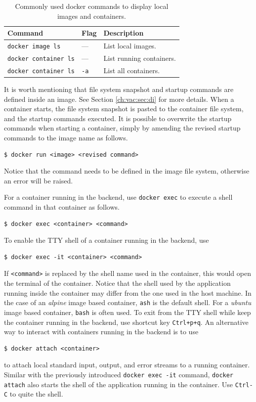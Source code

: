 \begin{table}
	\centering \caption{Commonly used docker commands to display local images and containers.}\label{ch:vac:tab:listcontainer}
	\begin{tabularx}{\textwidth}{llX}
		\hline
		Command & Flag & Description \\ \hline
        \verb|docker image ls| & --- & List local images. \\ \hdashline
        \verb|docker container ls| & --- & List running containers. \\ \hdashline
        \verb|docker container ls| & \verb|-a| & List all containers. \\
		\hline
	\end{tabularx}
\end{table}

It is worth mentioning that file system snapshot and startup commands are defined inside an image. See Section \ref{ch:vac:sec:di} for more details. When a container starts, the file system snapshot is pasted to the container file system, and the startup commands executed. It is possible to overwrite the startup commands when starting a container, simply by amending the revised startup commands to the image name as follows.
\begin{lstlisting}
$ docker run <image> <revised command>
\end{lstlisting}
Notice that the command needs to be defined in the image file system, otherwise an error will be raised.

For a container running in the backend, use \verb|docker exec| to execute a shell command in that container as follows.
\begin{lstlisting}
$ docker exec <container> <command>
\end{lstlisting}
To enable the TTY shell of a container running in the backend, use
\begin{lstlisting}
$ docker exec -it <container> <command>
\end{lstlisting}
If \verb|<command>| is replaced by the shell name used in the container, this would open the terminal of the container. Notice that the shell used by the application running inside the container may differ from the one used in the host machine. In the case of an \textit{alpine} image based container, \verb|ash| is the default shell. For a \textit{ubuntu} image based container, \verb|bash| is often used. To exit from the TTY shell while keep the container running in the backend, use shortcut key \verb|Ctrl+p+q|. An alternative way to interact with containers running in the backend is to use
\begin{lstlisting}
$ docker attach <container>
\end{lstlisting}
to attach local standard input, output, and error streams to a running container. Similar with the previously introduced \texttt{docker exec -it} command, \texttt{docker attach} also starts the shell of the application running in the container. Use \verb|Ctrl-C| to quite the shell.

